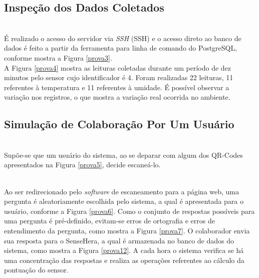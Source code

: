 \subsection{Inspeção dos Dados Coletados}
\label{subsec:dados}
\\\null \quad É realizado o acesso do servidor via \textit{\acrlong{SSH}} (\acrshort{SSH}) e o acesso direto ao banco de dados é feito a partir da ferramenta para linha de comando do PostgreSQL, conforme mostra a Figura \ref{prova3}.
\\\null \quad A Figura \ref{prova4} mostra as leituras coletadas durante um período de dez minutos pelo sensor cujo identificador é 4. Foram realizadas 22 leituras, 11 referentes à temperatura e 11 referentes à umidade. É possível observar a variação nos registros, o que mostra a variação real ocorrida no ambiente.
\pagebreak
{}

\subsection{Simulação de Colaboração Por Um Usuário}
\label{subsec:colaboracao}
\\\null \quad Supõe-se que um usuário do sistema, ao se deparar com algum dos QR-Codes apresentados na Figura \ref{prova5}, decide escaneá-lo.
\pagebreak
{}

\\\null \quad Ao ser redirecionado pelo \textit{software} de escaneamento para a página web, uma pergunta é aleatoriamente escolhida pelo sistema, a qual é apresentada para o usuário, conforme a Figura \ref{prova6}. Como o conjunto de respostas possíveis para uma pergunta é pré-definido, evitam-se erros de ortografia e erros de entendimento da pergunta, como mostra a Figura \ref{prova7}. O colaborador envia sua resposta para o SenseHera, a qual é armazenada no banco de dados do sistema, como mostra a Figura \ref{prova12}. A cada hora o sistema verifica se há uma concentração das respostas e realiza as operações referentes ao cálculo da pontuação do sensor.
\pagebreak
{}

